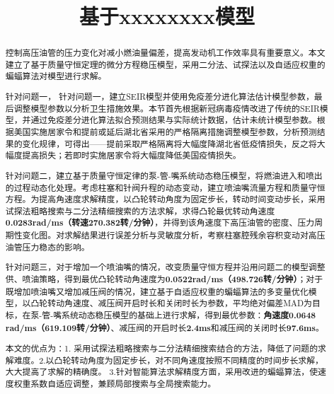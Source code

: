 \documentclass{whutmod}
\title{基于xxxxxxxx模型}
\begin{document}
	\maketitle
	\thispagestyle{empty}
	\begin{abstract}
		控制高压油管的压力变化对减小燃油量偏差，提高发动机工作效率具有重要意义。本文建立了基于质量守恒定理的微分方程稳压模型，采用二分法、试探法以及自适应权重的蝙蝠算法对模型进行求解。
		\vspace{6pt}	%


		针对问题一，	针对问题一，建立SEIR模型并使用免疫差分进化算法估计模型参数，最后调整模型参数以分析卫生措施效果。本节首先根据新冠病毒疫情改进了传统的SEIR模型，并通过免疫差分进化算法拟合预测结果与实际统计数据，估计未统计模型参数。根据美国实施居家令和提前或延后湖北省采用的严格隔离措施调整模型参数，分析预测结果的变化规律，可得出——提前采取严格隔离将大幅度降湖北省低疫情损失，反之将大幅度提高损失；若即时实施居家令将大幅度降低美国疫情损失。
		\vspace{6pt}	%
		

	
		针对问题二，建立基于质量守恒定律的泵-管-嘴系统动态稳压模型，将燃油进入和喷出的过程动态化处理。考虑柱塞和针阀升程的动态变动，建立喷油嘴流量方程和质量守恒方程。为提高角速度求解精度，以凸轮转动角度为固定步长，转动时间变动步长，采用试探法粗略搜索与二分法精细搜索的方法求解，求得凸轮最优转动角速度\textbf{0.0283rad/ms（转速270.382转/分钟）}，并得到该角速度下高压油管的密度、压力周期性变化图。对求解结果进行误差分析与灵敏度分析，考察柱塞腔残余容积变动对高压油管压力稳态的影响。
		\vspace{6pt}	%
	
		针对问题三，对于增加一个喷油嘴的情况，改变质量守恒方程并沿用问题二的模型调整供、喷油策略，得到最优凸轮转动角速度为\textbf{0.0522rad/ms（498.726转/分钟）}；对于既增加喷油嘴又增加减压阀的情况，建立基于自适应权重的蝙蝠算法的多变量优化模型，以凸轮转动角速度、减压阀开启时长和关闭时长为参数，平均绝对偏差MAD为目标，在泵-管-嘴系统动态稳压模型的基础上进行求解，得到最优参数：\textbf{角速度0.0648 rad/ms（619.109转/分钟）}、减压阀的开启时长\textbf{2.4ms}和减压阀的关闭时长\textbf{97.6ms}。
		\vspace{6pt}	%
	
		本文的优点为：1. 采用试探法粗略搜索与二分法精细搜索结合的方法，降低了问题的求解难度。2.以凸轮转动角度为固定步长，对不同角速度按照不同精度的时间步长求解，大大提高了求解的精确度。 3.针对智能算法求解精度方面，采用改进的蝙蝠算法，使速度权重系数自适应调整，兼顾局部搜索与全局搜索能力。
		
	\end{abstract}
\end{document}
